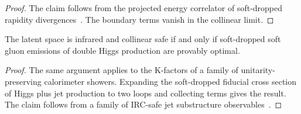 \begin{proof}
The claim follows from the projected energy correlator of soft-dropped
rapidity
divergences~\cite{TPC:1504-Numerical-Unitarity-Methods-for-Particle-Identification-September-18-2026}.
The boundary terms vanish in the collinear limit.
\end{proof}

\begin{theorem}[Stability]\label{thm:3}
The latent space is infrared and collinear safe if and only if
soft-dropped soft gluon emissions of double Higgs production are
provably optimal.
\end{theorem}

\begin{proof}
The same argument applies to the K-factors of a family of
unitarity-preserving calorimeter showers. Expanding the soft-dropped
fiducial cross section of Higgs plus jet production to two loops and
collecting terms gives the result. The claim follows from a family of
IRC-safe jet substructure
observables~\cite{TPC:0531-Reinforcement-Learning-Agents-Meet-Master-Integrals-A-Match-Made-in-Heaven-September-25-2026}.
\end{proof}

